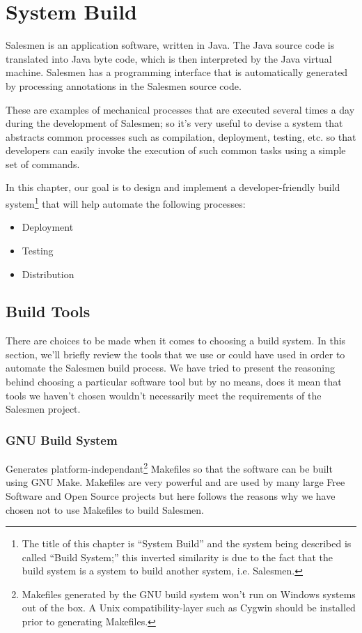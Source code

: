 \chapter{System Build}\label{BuildSystem}

Salesmen is an application software, written in Java. The Java source code
is translated into Java byte code, which is then interpreted by the Java
virtual machine. Salesmen has a programming interface that is automatically
generated by processing annotations in the Salesmen source code.

These are examples of mechanical processes that are executed several times 
a day during the development of Salesmen; so it's very useful to devise a 
system that abstracts common processes such as compilation, deployment, 
testing, etc. so that developers can easily invoke the execution of
such common tasks using a simple set of commands.

In this chapter, our goal is to design and implement a 
developer-friendly build system\footnote{The title of this chapter is 
``System Build'' and the system being described is called 
``Build System;'' this inverted similarity is due to the fact that the 
build system is a system to build another system, i.e. Salesmen.}
that will help automate the following processes:

\begin{itemize}
\item
Deployment
\item
Testing
\item
Distribution
\end{itemize}
\newpage

\section{Build Tools}\label{BuildSystemTools}

There are choices to be made when it comes to choosing a build system. 
In this section, we'll briefly review the tools that we use or could have
used in order to automate the Salesmen build process. We have tried to 
present the reasoning behind choosing a particular software tool but
by no means, does it mean that tools we haven't chosen wouldn't
necessarily meet the requirements of the Salesmen project.

\subsection{GNU Build System}\label{BuildSystemToolsGNUBuildSystem}
Generates platform-independant\footnote{Makefiles generated by the GNU 
build system won't run on Windows systems out of the box. A Unix
compatibility-layer such as Cygwin should be installed prior to
generating Makefiles.}
Makefiles so that the software can be built using GNU Make.
Makefiles are very powerful and are used by many large Free Software and
Open Source projects but here follows the reasons why we have chosen
not to use Makefiles to build Salesmen.

